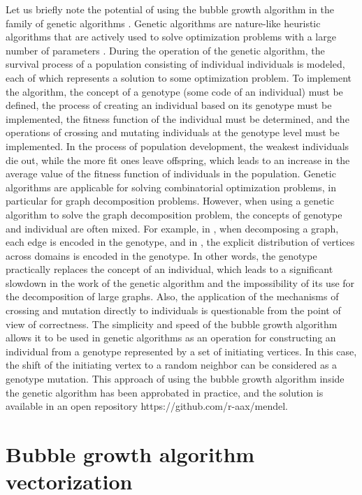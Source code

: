 \documentclass[
11pt,%
tightenlines,%
twoside,%
onecolumn,%
nofloats,%
nobibnotes,%
nofootinbib,%
superscriptaddress,%
noshowpacs,%
centertags]%
{revtex4}
\begin{document}
Let us briefly note the potential of using the bubble growth algorithm in the family of genetic algorithms \cite{20Katosh}.
Genetic algorithms are nature-like heuristic algorithms that are actively used to solve optimization problems with a large number of parameters \cite{21Wirayanti}.
During the operation of the genetic algorithm, the survival process of a population consisting of individual individuals is modeled, each of which represents a solution to some optimization problem.
To implement the algorithm, the concept of a genotype (some code of an individual) must be defined, the process of creating an individual based on its genotype must be implemented, the fitness function of the individual must be determined, and the operations of crossing and mutating individuals at the genotype level must be implemented.
In the process of population development, the weakest individuals die out, while the more fit ones leave offspring, which leads to an increase in the average value of the fitness function of individuals in the population.
Genetic algorithms are applicable for solving combinatorial optimization problems, in particular for graph decomposition problems.
However, when using a genetic algorithm to solve the graph decomposition problem, the concepts of genotype and individual are often mixed.
For example, in \cite{22Chaouche}, when decomposing a graph, each edge is encoded in the genotype, and in \cite{23Li}, the explicit distribution of vertices across domains is encoded in the genotype.
In other words, the genotype practically replaces the concept of an individual, which leads to a significant slowdown in the work of the genetic algorithm and the impossibility of its use for the decomposition of large graphs.
Also, the application of the mechanisms of crossing and mutation directly to individuals is questionable from the point of view of correctness.
The simplicity and speed of the bubble growth algorithm allows it to be used in genetic algorithms as an operation for constructing an individual from a genotype represented by a set of initiating vertices.
In this case, the shift of the initiating vertex to a random neighbor can be considered as a genotype mutation.
This approach of using the bubble growth algorithm inside the genetic algorithm has been approbated in practice, and the solution is available in an open repository https://github.com/r-aax/mendel.

\section{Bubble growth algorithm vectorization}
\end{document}
